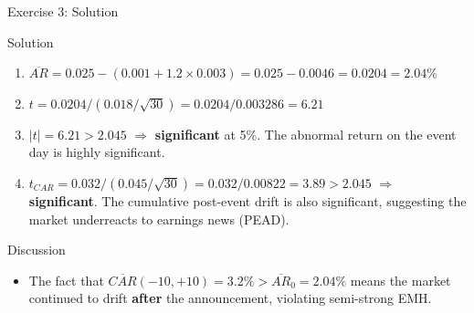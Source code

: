 \documentclass[9pt, aspectratio=169, t]{beamer}
\theoremstyle{definition}
\newenvironment{cminipage}[1]{%
    \par\noindent\hfill\begin{minipage}{#1}\ignorespaces
}{%
    \end{minipage}\hfill\null\par
}
\begin{document}
\begin{frame}{Exercise 3: Solution}
\begin{cminipage}{0.95\textwidth}
\begin{block}{Solution}
\begin{enumerate}
\item $\overline{AR} = 0.025 - (0.001 + 1.2 \times 0.003) = 0.025 - 0.0046 = 0.0204 = 2.04\%$
\item $t = 0.0204 / (0.018/\sqrt{30}) = 0.0204 / 0.003286 = 6.21$
\item $|t| = 6.21 > 2.045$ $\Rightarrow$ \textbf{significant} at 5\%. The abnormal return on the event day is highly significant.
\item $t_{CAR} = 0.032 / (0.045/\sqrt{30}) = 0.032/0.00822 = 3.89 > 2.045$ $\Rightarrow$ \textbf{significant}. The cumulative post-event drift is also significant, suggesting the market underreacts to earnings news (PEAD).
\end{enumerate}
\end{block}
\vspace{0.1cm}
\begin{exampleblock}{Discussion}
\begin{itemize}\setlength{\itemsep}{0pt}
    \item The fact that $\overline{CAR}(-10,+10) = 3.2\% > \overline{AR}_0 = 2.04\%$ means the market continued to drift \textbf{after} the announcement, violating semi-strong EMH.
\end{itemize}
\end{exampleblock}
\end{cminipage}
\end{frame}
\end{document}
